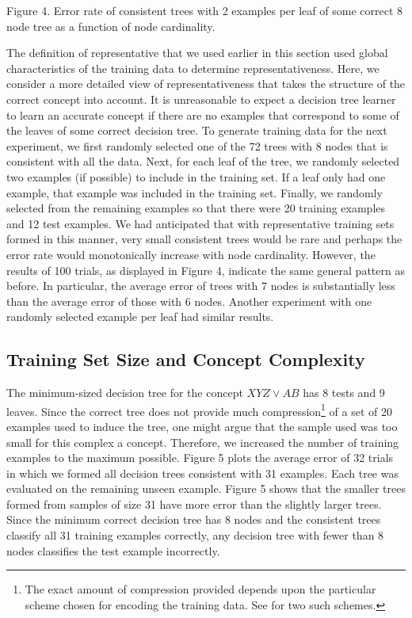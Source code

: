 \vspace{0.2cm}
\parindent 0.0cm
Figure 4. Error rate of consistent trees with 2 examples per leaf of some
correct 8 node tree as a function of node cardinality.\\
\parindent 0.6cm
\parskip 0.0cm

The definition of representative that we used earlier in this section
used global characteristics of the training data to determine
representativeness.  Here, we consider a more detailed view of
representativeness that takes the structure of the correct concept
into account.  It is unreasonable to expect a decision tree learner to
learn an accurate concept if there are no examples that correspond to
some of the leaves of some correct decision tree.  To generate training
data for the next experiment, we first randomly selected one of the 72
trees with 8 nodes that is consistent with all the data.  Next,
for each leaf of the tree, we randomly selected two examples (if
possible) to include in the training set. If a leaf only had one
example, that example was included in the training set.  Finally, we
randomly selected from the remaining examples so that there were 20
training examples and 12 test examples.  We had anticipated that with
representative training sets formed in this manner, very small
consistent trees would be rare and perhaps the error rate would
monotonically increase with node cardinality.  However, the results of
100 trials, as displayed in Figure 4, indicate the same general pattern 
as before.  In particular, the average error of trees with 7 nodes is
substantially less than the average error of those with 6 nodes.  Another
experiment with one randomly selected example per leaf had similar results.

\subsection{Training Set Size and Concept Complexity}

The minimum-sized decision tree for the concept $XYZ \vee AB$ has 8
tests and 9 leaves.  Since the correct tree does not provide much
compression\footnote{The exact amount of compression provided depends
upon the particular scheme chosen for encoding the training data.
See \cite{quinlan89,wallace93} for two
such schemes.} of a set of 20 examples used to induce the tree, one
might argue that the sample used was too small for this complex a
concept.  Therefore, we increased the number of training examples
to the maximum possible.  Figure 5 plots the average error of 32 trials 
in which we formed all decision trees consistent with 31 examples.  Each 
tree was evaluated on the remaining unseen example.  Figure 5 shows that 
the smaller trees formed from samples of size 31 have more error than the 
slightly larger trees.  Since the minimum correct decision tree has 8 nodes 
and the consistent trees classify all 31 training examples correctly, 
any decision tree with fewer than 8 nodes classifies the test example
incorrectly.


